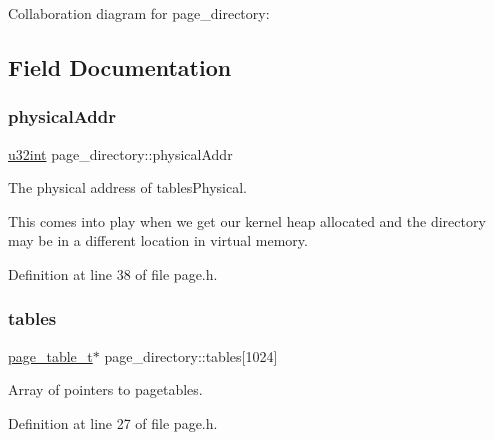 Collaboration diagram for page\+\_\+directory\+:


\subsection{Field Documentation}
\mbox{\label{a00246_a69f56a12e20a59682292842323aabefb_a69f56a12e20a59682292842323aabefb}} 
\subsubsection{\texorpdfstring{physical\+Addr}{physicalAddr}}
{\footnotesize\ttfamily \hyperlink{a00134_a7ae3a26c17ddfe117c6291739780801d_a7ae3a26c17ddfe117c6291739780801d}{u32int} page\+\_\+directory\+::physical\+Addr}



The physical address of tables\+Physical. 

This comes into play when we get our kernel heap allocated and the directory may be in a different location in virtual memory. 

Definition at line 38 of file page.\+h.

\mbox{\label{a00246_a84d1c51d205ba38ef8356fda66065877_a84d1c51d205ba38ef8356fda66065877}} 
\subsubsection{\texorpdfstring{tables}{tables}}
{\footnotesize\ttfamily \hyperlink{a00116_a052d6ef76d4f16828bb0f478b24b6b55_a052d6ef76d4f16828bb0f478b24b6b55}{page\+\_\+table\+\_\+t}$\ast$ page\+\_\+directory\+::tables\mbox{[}1024\mbox{]}}



Array of pointers to pagetables. 



Definition at line 27 of file page.\+h.

\mbox{\label{a00246_a99a9e823491d762288ceb3faf2b1088b_a99a9e823491d762288ceb3faf2b1088b}} 
